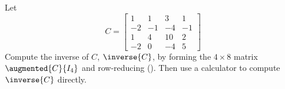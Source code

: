 Let
%
\begin{equation*}
C=
\begin{bmatrix}
 1 & 1 & 3 & 1\\
 -2 & -1 & -4 & -1\\
 1 & 4 & 10 & 2\\
 -2 & 0 & -4 & 5
\end{bmatrix}
\end{equation*}
%
Compute the inverse of $C$, $\inverse{C}$, by forming the $4\times 8$ matrix $\augmented{C}{I_4}$ and row-reducing ().  Then use a calculator to compute $\inverse{C}$ directly.
